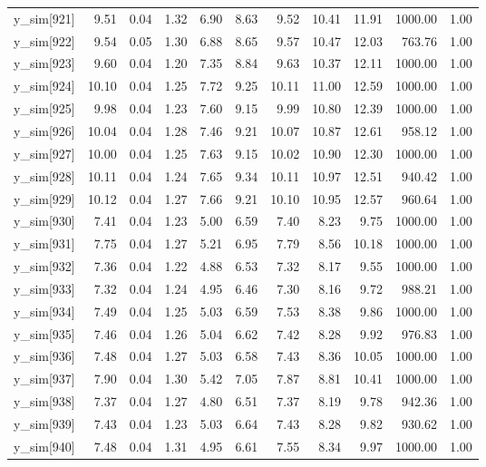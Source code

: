 \begin{table}[ht]
\begin{tabular}{rrrrrrrrrrr}
  y\_sim[921] & 9.51 & 0.04 & 1.32 & 6.90 & 8.63 & 9.52 & 10.41 & 11.91 & 1000.00 & 1.00 \\ 
  y\_sim[922] & 9.54 & 0.05 & 1.30 & 6.88 & 8.65 & 9.57 & 10.47 & 12.03 & 763.76 & 1.00 \\ 
  y\_sim[923] & 9.60 & 0.04 & 1.20 & 7.35 & 8.84 & 9.63 & 10.37 & 12.11 & 1000.00 & 1.00 \\ 
  y\_sim[924] & 10.10 & 0.04 & 1.25 & 7.72 & 9.25 & 10.11 & 11.00 & 12.59 & 1000.00 & 1.00 \\ 
  y\_sim[925] & 9.98 & 0.04 & 1.23 & 7.60 & 9.15 & 9.99 & 10.80 & 12.39 & 1000.00 & 1.00 \\ 
  y\_sim[926] & 10.04 & 0.04 & 1.28 & 7.46 & 9.21 & 10.07 & 10.87 & 12.61 & 958.12 & 1.00 \\ 
  y\_sim[927] & 10.00 & 0.04 & 1.25 & 7.63 & 9.15 & 10.02 & 10.90 & 12.30 & 1000.00 & 1.00 \\ 
  y\_sim[928] & 10.11 & 0.04 & 1.24 & 7.65 & 9.34 & 10.11 & 10.97 & 12.51 & 940.42 & 1.00 \\ 
  y\_sim[929] & 10.12 & 0.04 & 1.27 & 7.66 & 9.21 & 10.10 & 10.95 & 12.57 & 960.64 & 1.00 \\ 
  y\_sim[930] & 7.41 & 0.04 & 1.23 & 5.00 & 6.59 & 7.40 & 8.23 & 9.75 & 1000.00 & 1.00 \\ 
  y\_sim[931] & 7.75 & 0.04 & 1.27 & 5.21 & 6.95 & 7.79 & 8.56 & 10.18 & 1000.00 & 1.00 \\ 
  y\_sim[932] & 7.36 & 0.04 & 1.22 & 4.88 & 6.53 & 7.32 & 8.17 & 9.55 & 1000.00 & 1.00 \\ 
  y\_sim[933] & 7.32 & 0.04 & 1.24 & 4.95 & 6.46 & 7.30 & 8.16 & 9.72 & 988.21 & 1.00 \\ 
  y\_sim[934] & 7.49 & 0.04 & 1.25 & 5.03 & 6.59 & 7.53 & 8.38 & 9.86 & 1000.00 & 1.00 \\ 
  y\_sim[935] & 7.46 & 0.04 & 1.26 & 5.04 & 6.62 & 7.42 & 8.28 & 9.92 & 976.83 & 1.00 \\ 
  y\_sim[936] & 7.48 & 0.04 & 1.27 & 5.03 & 6.58 & 7.43 & 8.36 & 10.05 & 1000.00 & 1.00 \\ 
  y\_sim[937] & 7.90 & 0.04 & 1.30 & 5.42 & 7.05 & 7.87 & 8.81 & 10.41 & 1000.00 & 1.00 \\ 
  y\_sim[938] & 7.37 & 0.04 & 1.27 & 4.80 & 6.51 & 7.37 & 8.19 & 9.78 & 942.36 & 1.00 \\ 
  y\_sim[939] & 7.43 & 0.04 & 1.23 & 5.03 & 6.64 & 7.43 & 8.28 & 9.82 & 930.62 & 1.00 \\ 
  y\_sim[940] & 7.48 & 0.04 & 1.31 & 4.95 & 6.61 & 7.55 & 8.34 & 9.97 & 1000.00 & 1.00 \\ 

\end{tabular}
\end{table}
